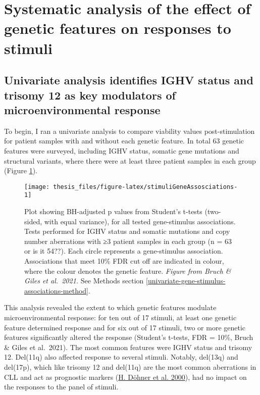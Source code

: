 \documentclass[11pt, a4paper, twosided]{book}
\begin{document}
\hypertarget{systematic-analysis-of-the-effect-of-genetic-features-on-responses-to-stimuli}{%
\section{Systematic analysis of the effect of genetic features on responses to stimuli}\label{systematic-analysis-of-the-effect-of-genetic-features-on-responses-to-stimuli}}

\hypertarget{univariate-gene-stimulus-assosciations}{%
\subsection{Univariate analysis identifies IGHV status and trisomy 12 as key modulators of microenvironmental response}\label{univariate-gene-stimulus-assosciations}}

To begin, I ran a univariate analysis to compare viability values post-stimulation for patient samples with and without each genetic feature. In total 63 genetic features were surveyed, including IGHV status, somatic gene mutations and structural variants, where there were at least three patient samples in each group (Figure \ref{fig:stimuliGeneAssosciations}).


\begin{figure}

{\centering \texttt{[image: thesis\_files/figure-latex/stimuliGeneAssosciations-1]} 

}

\caption{Plot showing BH-adjusted p values from Student's t-tests (two-sided, with equal variance), for all tested gene-stimulus associations. Tests performed for IGHV status and somatic mutations and copy number aberrations with ≥3 patient samples in each group (n = 63 or is it 54??). Each circle represents a gene-stimulus association. Associations that meet 10\% FDR cut off are indicated in colour, where the colour denotes the genetic feature. \emph{Figure from Bruch \& Giles et al.~2021.} See Methods section \ref{univariate-gene-stimulus-associations-method}.}\label{fig:stimuliGeneAssosciations}
\end{figure}
This analysis revealed the extent to which genetic features modulate microenvironmental response: for ten out of 17 stimuli, at least one genetic feature determined response and for six out of 17 stimuli, two or more genetic features significantly altered the response (Student's t-tests, FDR = 10\%, Bruch \& Giles et al.~2021). The most common features were IGHV status and trisomy 12. Del(11q) also affected response to several stimuli. Notably, del(13q) and del(17p), which like trisomy 12 and del(11q) are the most common aberrations in CLL and act as prognostic markers (\protect\hyperlink{ref-Dohner2000}{H. Döhner et al. 2000}), had no impact on the responses to the panel of stimuli.
\end{document}
